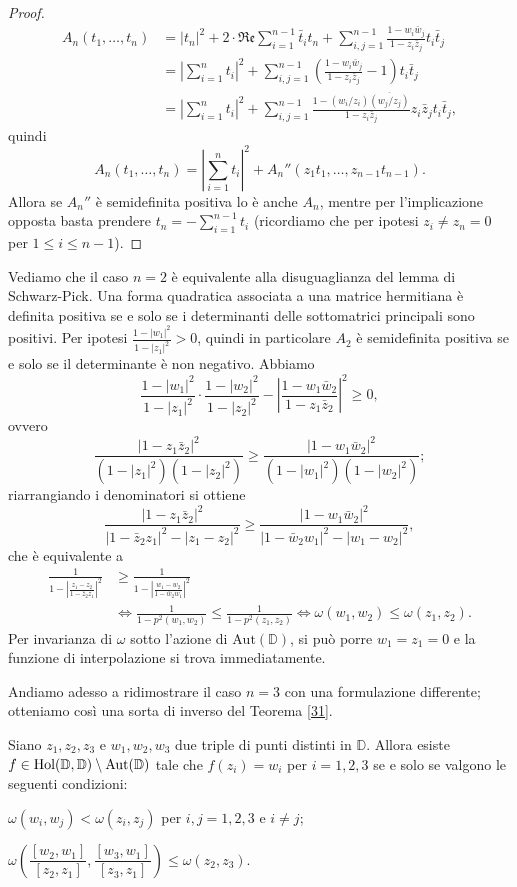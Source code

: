 \begin{proof}
\begin{align*}
    A_n(t_1,\dots,t_n)&=|t_n|^2+2\cdot\mathfrak{Re}\sum_{i=1}^{n-1}\bar{t}_it_n+\sum_{i,j=1}^{n-1}\frac{1-w_i\bar{w}_j}{1-z_i\bar{z}_j}t_i\bar{t}_j \\
    &=\left|\sum_{i=1}^n t_i\right|^2+\sum_{i,j=1}^{n-1}\left(\frac{1-w_i\bar{w}_j}{1-z_i\bar{z}_j}-1\right)t_i\bar{t}_j \\
    &=\left|\sum_{i=1}^n t_i\right|^2+\sum_{i,j=1}^{n-1}\frac{1-(w_i/z_i)\overline{(w_j/z_j)}}{1-z_i\bar{z}_j}z_i\bar{z}_jt_i\bar{t}_j,
  \end{align*}
  quindi
  $$A_n(t_1,\dots,t_n)=\left|\sum_{i=1}^n t_i\right|^2+A_n''(z_1t_1,\dots,z_{n-1}t_{n-1}).$$
  Allora se $A_n''$ è semidefinita positiva lo è anche $A_n$, mentre per l'implicazione opposta basta prendere $\displaystyle t_n=-\sum_{i=1}^{n-1} t_i$ (ricordiamo che per ipotesi $z_i\not=z_n=0$ per $1 \le i \le n-1$).
\end{proof}

Vediamo che il caso $n=2$ è equivalente alla disuguaglianza del lemma di Schwarz-Pick. Una forma quadratica associata a una matrice hermitiana è definita positiva se e solo se i determinanti delle sottomatrici principali sono positivi. Per ipotesi $\frac{1-|w_1|^2}{1-|z_1|^2} > 0$, quindi in particolare $A_2$ è semidefinita positiva se e solo se il determinante è non negativo. Abbiamo
$$\frac{1-|w_1|^2}{1-|z_1|^2}\cdot\frac{1-|w_2|^2}{1-|z_2|^2}-\left|\frac{1-w_1\bar{w}_2}{1-z_1\bar{z}_2}\right|^2 \ge 0,$$
ovvero
$$\frac{|1-z_1\bar{z}_2|^2}{(1-|z_1|^2)(1-|z_2|^2)} \ge \frac{|1-w_1\bar{w}_2|^2}{(1-|w_1|^2)(1-|w_2|^2)};$$
riarrangiando i denominatori si ottiene
$$\frac{|1-z_1\bar{z}_2|^2}{|1-\bar{z}_2z_1|^2-|z_1-z_2|^2} \ge \frac{|1-w_1\bar{w}_2|^2}{|1-\bar{w}_2w_1|^2-|w_1-w_2|^2},$$
che è equivalente a
\begin{align*}
  \frac{1}{1-\left|\frac{z_1-z_2}{1-\bar{z}_2z_1}\right|^2} & \ge \frac{1}{1-\left|\frac{w_1-w_2}{1-\bar{w}_2w_1}\right|^2} \\
  & \Leftrightarrow \frac{1}{1-p^2(w_1,w_2)} \le \frac{1}{1-p^2(z_1,z_2)} \Leftrightarrow \omega(w_1,w_2) \le \omega(z_1,z_2).
\end{align*}
Per invarianza di $\omega$ sotto l'azione di $\text{Aut}(\mathbb{D})$, si può porre $w_1=z_1=0$ e la funzione di interpolazione si trova immediatamente.

Andiamo adesso a ridimostrare il caso $n=3$ con una formulazione differente; otteniamo così una sorta di inverso del Teorema \ref{31}.

\begin{thm}
  Siano $z_1, z_2, z_3$ e $w_1, w_2, w_3$ due triple di punti distinti in $\mathbb{D}$. Allora esiste $f \in \normalfont{\text{Hol}}(\mathbb{D},\mathbb{D}) \setminus \normalfont{\text{Aut}}(\mathbb{D})$ tale che $f(z_i)=w_i$ per $i=1,2,3$ se e solo se valgono le seguenti condizioni:
  \begin{nlist}
    \item $\omega(w_i,w_j)<\omega(z_i,z_j)$ per $i,j=1,2,3$ e $i\not=j$;
    \item $\omega\left(\dfrac{[w_2,w_1]}{[z_2,z_1]},\dfrac{[w_3,w_1]}{[z_3,z_1]}\right) \le \omega(z_2,z_3)$.
  \end{nlist}
\end{thm}

